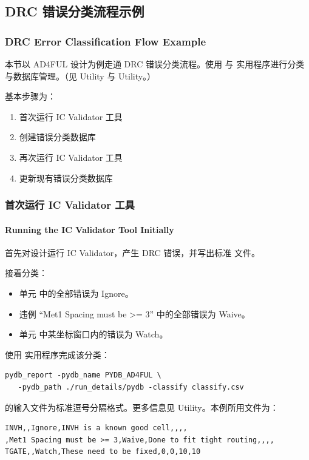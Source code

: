 \subsection{DRC 错误分类流程示例}
\subsubsection*{DRC Error Classification Flow Example}

本节以 AD4FUL 设计为例走通 DRC 错误分类流程。使用  与  实用程序进行分类与数据库管理。（见  Utility 与  Utility。）

基本步骤为：
\begin{enumerate}
  \item 首次运行 IC Validator 工具
  \item 创建错误分类数据库
  \item 再次运行 IC Validator 工具
  \item 更新现有错误分类数据库
\end{enumerate}

\subsubsection{首次运行 IC Validator 工具}
\paragraph*{Running the IC Validator Tool Initially}

首先对设计运行 IC Validator，产生 DRC 错误，并写出标准  文件。

接着分类：
\begin{itemize}
  \item 单元  中的全部错误为 Ignore。
  \item 违例 ``Met1 Spacing must be >= 3'' 中的全部错误为 Waive。
  \item 单元  中某坐标窗口内的错误为 Watch。
\end{itemize}

使用  实用程序完成该分类：
\begin{lstlisting}[style=shell]
pydb_report -pydb_name PYDB_AD4FUL \
   -pydb_path ./run_details/pydb -classify classify.csv
\end{lstlisting}

 的输入文件为标准逗号分隔格式。更多信息见  Utility。本例所用文件为：
\begin{lstlisting}[style=shell]
INVH,,Ignore,INVH is a known good cell,,,,
,Met1 Spacing must be >= 3,Waive,Done to fit tight routing,,,,
TGATE,,Watch,These need to be fixed,0,0,10,10
\end{lstlisting}

